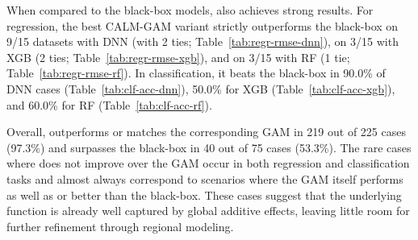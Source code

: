 When compared to the black-box models, \method{} also achieves strong results. For regression, the best CALM-GAM variant strictly outperforms the black-box on 9/15 datasets with DNN (with 2 ties; Table~\ref{tab:regr-rmse-dnn}), on 3/15 with XGB (2 ties; Table~\ref{tab:regr-rmse-xgb}), and on 3/15 with RF (1 tie; Table~\ref{tab:regr-rmse-rf}). In classification, it beats the black-box in 90.0\% of DNN cases (Table~\ref{tab:clf-acc-dnn}), 50.0\% for XGB (Table~\ref{tab:clf-acc-xgb}), and 60.0\% for RF (Table~\ref{tab:clf-acc-rf}).

Overall, \method{} outperforms or matches the corresponding GAM in 219 out of 225 cases (97.3\%) and surpasses the black-box in 40 out of 75 cases (53.3\%). The rare cases where \method{} does not improve over the GAM occur in both regression and classification tasks and almost always correspond to scenarios where the GAM itself performs as well as or better than the black-box. These cases suggest that the underlying function is already well captured by global additive effects, leaving little room for further refinement through regional modeling. 

